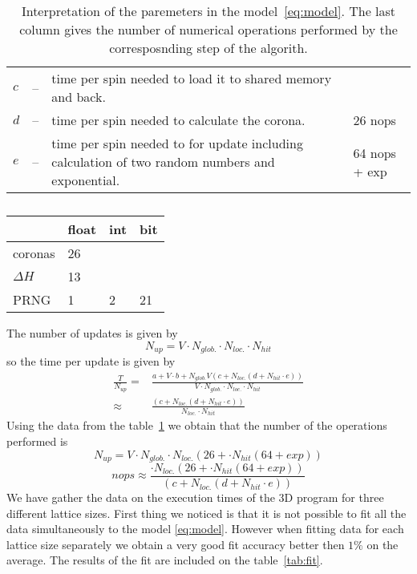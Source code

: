 \documentclass[a4paper]{llncs}
\begin{document}
\begin{table}
\begin{center} \begin{tabular}{lcp{8cm}p{2cm}}
$c$ &--& time per spin needed to load it to shared memory and back.&\\
$d$ &--& time per spin needed to calculate the corona.& 26 nops\\
$e$ &--& time per spin needed to for update including calculation of two random numbers and exponential. & 64 nops + exp
\end{tabular}
\end{center}
\caption{\label{tab:pars-int}Interpretation of the paremeters in the model~\ref{eq:model}. The last column gives the number of numerical operations performed by the corresposnding step of the algorith.}
\end{table}

\begin{table}
\begin{center} 
\begin{tabular}{|p{4cm}|l|l|l|}\hline\hline
 & float & int  & bit \\\hline
coronas & 26 & & \\\hline
$\Delta H  $ & 13  & & \\\hline
PRNG & 1 & 2  & 21  \\\hline\hline
\end{tabular}
\end{center}
\caption{\label{tab:instr-count}}
\end{table}

The number of updates is given by
\begin{equation}
N_{up}=V\cdot N_{glob.}\cdot N_{loc.}\cdot N_{hit}
\end{equation}
so the time per update is given by
\begin{equation}\begin{split}
\frac{T}{N_{up}}=&\frac{a+ V \cdot b + N_{glob.} V \left(c + N_{loc.}\left(d + N_{hit}\cdot e\right)\right)}{V\cdot N_{glob.}\cdot N_{loc.}\cdot N_{hit}}\\
\approx&
\frac{ \left(c + N_{loc.}\left(d + N_{hit}\cdot e\right)\right)}{N_{loc.}\cdot N_{hit}}
\end{split}
\end{equation}
Using the data from the table~\ref{tab:pars-int} we obtain that the number of the operations performed is
\begin{equation}
N_{up}=V\cdot N_{glob.}\cdot N_{loc.}(26+\cdot N_{hit}(64+exp))
\end{equation}
\begin{equation}
nops\approx \frac{\cdot N_{loc.}(26+\cdot N_{hit}(64+exp))}{ \left(c + N_{loc.}\left(d + N_{hit}\cdot e\right)\right)}
\end{equation}
We have gather the data on the execution times of the 3D program for
three different lattice sizes. First thing we noticed is that it is
not possible to fit all the data simultaneously to the model
\eqref{eq:model}. However when fitting data for each lattice size
separately we obtain a very good fit accuracy better then $1\%$ on the
average. The results of the fit are included on the table~\ref{tab:fit}.
\end{document}

